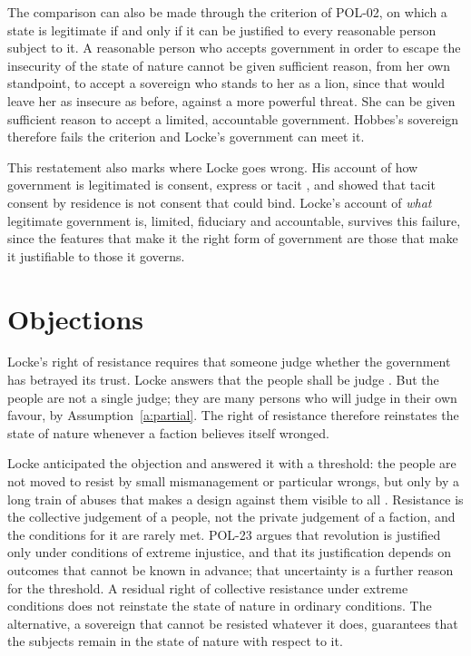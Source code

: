 \documentclass{situationist-preprint}
\begin{document}
The comparison can also be made through the criterion of POL-02, on which a state is legitimate if and only if it can be justified to every reasonable person subject to it. A reasonable person who accepts government in order to escape the insecurity of the state of nature cannot be given sufficient reason, from her own standpoint, to accept a sovereign who stands to her as a lion, since that would leave her as insecure as before, against a more powerful threat. She can be given sufficient reason to accept a limited, accountable government. Hobbes's sovereign therefore fails the criterion and Locke's government can meet it.

This restatement also marks where Locke goes wrong. His account of how government is legitimated is consent, express or tacit \citep[\S\S 95--122]{Locke1689}, and \citet{Hume1748} showed that tacit consent by residence is not consent that could bind. Locke's account of \emph{what} legitimate government is, limited, fiduciary and accountable, survives this failure, since the features that make it the right form of government are those that make it justifiable to those it governs.

\section{Objections}

\begin{objection}
Locke's right of resistance requires that someone judge whether the government has betrayed its trust. Locke answers that the people shall be judge \citep[\S 240]{Locke1689}. But the people are not a single judge; they are many persons who will judge in their own favour, by Assumption~\ref{a:partial}. The right of resistance therefore reinstates the state of nature whenever a faction believes itself wronged.
\end{objection}

\begin{reply}
Locke anticipated the objection and answered it with a threshold: the people are not moved to resist by small mismanagement or particular wrongs, but only by a long train of abuses that makes a design against them visible to all \citep[\S 225]{Locke1689}. Resistance is the collective judgement of a people, not the private judgement of a faction, and the conditions for it are rarely met. POL-23 argues that revolution is justified only under conditions of extreme injustice, and that its justification depends on outcomes that cannot be known in advance; that uncertainty is a further reason for the threshold. A residual right of collective resistance under extreme conditions does not reinstate the state of nature in ordinary conditions. The alternative, a sovereign that cannot be resisted whatever it does, guarantees that the subjects remain in the state of nature with respect to it.
\end{reply}
\end{document}
